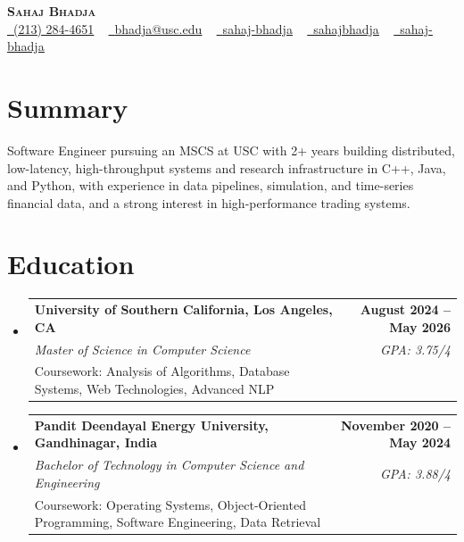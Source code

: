 \documentclass[letterpaper,10pt]{article}
\makeatletter
\newcommand{\resumeEduSubheading}[5]{\vspace{-1pt}\item\begin{tabular*}{1.0\textwidth}[t]{l@{\extracolsep{\fill}}r}\textbf{#1} & \textbf{\small #2} \\\textit{\small #3} & \textit{\small #4} \\\small #5 & \\\end{tabular*}\vspace{-4pt}}
\newcommand{\resumeSubHeadingListStart}{\begin{itemize}[leftmargin=0.0in, label={}]}
\newcommand{\resumeSubHeadingListEnd}{\end{itemize}}
\makeatother
\begin{document}
\begin{center}
{\Huge \scshape \textbf{Sahaj Bhadja}} \\ \vspace{1pt}
\small \href{tel:(213) 284-4651}{\faPhone\ \underline{(213) 284-4651}} ~ \href{mailto: bhadja@usc.edu}{\raisebox{-0.2\height}\faEnvelope\ \underline{bhadja@usc.edu}} ~
\href{https://www.linkedin.com/in/sahaj-bhadja/}{\raisebox{-0.2\height}\faLinkedin\ \underline{sahaj-bhadja}} ~ \href{https://github.com/SAHAJ-BHADJA}{\raisebox{-0.2\height}\faGithub\ \underline{sahajbhadja}} ~
\href{https://sahaj-bhadja.vercel.app/}{\raisebox{-0.2\height}\faGlobe\ \underline{sahaj-bhadja}}
\end{center}
\vspace{-16pt}
\section{Summary}
\begin{itemize}[leftmargin=0.15in, label={}]
\small{\item{Software Engineer pursuing an MSCS at USC with 2+ years building distributed, low-latency, high-throughput systems and research infrastructure in C++, Java, and Python, with experience in data pipelines, simulation, and time-series financial data, and a strong interest in high-performance trading systems.}}
\end{itemize}
\vspace{-6pt}
\section{Education}
\resumeSubHeadingListStart
\resumeEduSubheading{University of Southern California, Los Angeles, CA}{August 2024 -- May 2026}{Master of Science in Computer Science}{GPA: 3.75/4}{Coursework: Analysis of Algorithms, Database Systems, Web Technologies, Advanced NLP}
\vspace{-9pt}
\resumeEduSubheading{Pandit Deendayal Energy University, Gandhinagar, India}{November 2020 -- May 2024}{Bachelor of Technology in Computer Science and Engineering}{GPA: 3.88/4}{Coursework: Operating Systems, Object-Oriented Programming, Software Engineering, Data Retrieval}
\resumeSubHeadingListEnd
\vspace{-6pt}
\end{document}
